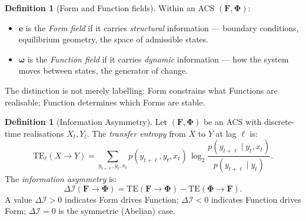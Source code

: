 \documentclass[11pt,a4paper]{article}
\theoremstyle{plain}
\theoremstyle{definition}
\newtheorem{definition}[theorem]{Definition}
\theoremstyle{remark}
\newcommand{\DI}{\Delta\mathcal{I}}
\newcommand{\FormF}{\mathbf{F}}
\newcommand{\FuncF}{\boldsymbol{\Phi}}
\renewcommand{\Form}{\mathbf{e}}
\providecommand{\Func}{\boldsymbol{\omega}}
\newcommand{\TE}{\mathrm{TE}}
\begin{document}
\begin{definition}[Form and Function fields]\label{def:FF}
Within an ACS $(\FormF, \FuncF)$:
\begin{itemize}[noitemsep]
  \item $\Form$ is the \emph{Form field} if it carries \emph{structural} 
    information --- boundary conditions, equilibrium geometry, the space of 
    admissible states.
  \item $\Func$ is the \emph{Function field} if it carries \emph{dynamic} 
    information --- how the system moves between states, the generator of 
    change.
\end{itemize}
The distinction is not merely labelling: Form constrains what Functions 
are realisable; Function determines which Forms are stable.
\end{definition}

\begin{definition}[Information Asymmetry]\label{def:DI}
Let $(\FormF, \FuncF)$ be an ACS with discrete-time realisations $X_t, Y_t$.
The \emph{transfer entropy} from $X$ to $Y$ at lag $\ell$ is:
\begin{equation}
  \TE_\ell(X \to Y) = 
  \sum_{y_{t+\ell}, y_t, x_t} 
  p(y_{t+\ell}, y_t, x_t)\,
  \log_2 \frac{p(y_{t+\ell} \mid y_t, x_t)}{p(y_{t+\ell} \mid y_t)}.
\end{equation}
The \emph{information asymmetry} is:
\begin{equation}
  \DI(\FormF \to \FuncF) = \TE(\FormF \to \FuncF) - \TE(\FuncF \to \FormF).
\end{equation}
A value $\DI > 0$ indicates Form drives Function;
$\DI < 0$ indicates Function drives Form;
$\DI = 0$ is the symmetric (Abelian) case.
\end{definition}
\end{document}
